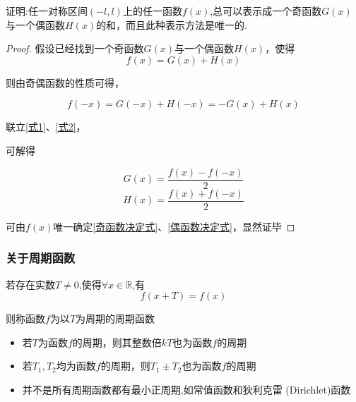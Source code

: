 \vspace{8pt}

\begin{example}
    证明:任一对称区间$(-l,l)$上的任一函数$f(x)$,总可以表示成一个奇函数$G(x)$与一个偶函数$H(x)$的和，而且此种表示方法是唯一的.
\end{example}

\begin{proof}

    假设已经找到一个奇函数$G(x)$与一个偶函数$H(x)$，使得
    \begin{equation}
        f(x)=G(x)+H(x) \label{式1}
    \end{equation}

    则由奇偶函数的性质可得，

    \begin{equation}
        f(-x)=G(-x)+H(-x)=-G(x)+H(x)    \label{式2}
    \end{equation}

    联立\cref{式1}、\cref{式2}，

    可解得

    \begin{equation}
        G(x) = \frac{f(x)-f(-x)}{2} \label{奇函数决定式}
    \end{equation}
    \begin{equation}
        H(x) = \frac{f(x)+f(-x)}{2} \label{偶函数决定式}
    \end{equation}

    可由$f(x)$唯一确定\cref{奇函数决定式}、\cref{偶函数决定式}，显然证毕
\end{proof}

\subsubsection{关于周期函数}
\begin{definition}[周期函数]
    若存在实数$T\ne 0$,使得$\forall x \in \mathbb{R} $,有
    \begin{equation*}
        f(x+T)=f(x)
    \end{equation*}

    则称函数$f$为以$T$为周期的周期函数
\end{definition}

\begin{note}
    \begin{itemize}
        \item 若$T$为函数$f$的周期，则其整数倍$kT$也为函数$f$的周期
        \item 若$T_1,T_2$均为函数$f$的周期，则$T_1\pm T_2$也为函数$f$的周期
        \item 并不是所有周期函数都有最小正周期,如常值函数和狄利克雷 (Dirichlet)函数
    \end{itemize}
\end{note}

